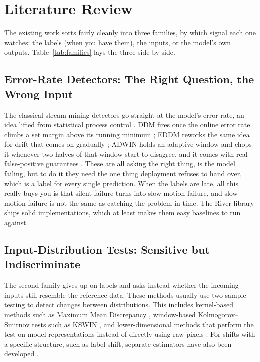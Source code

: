 \documentclass[graybox]{SNmult}
\begin{document}
\section{Literature Review}
\label{sec:survey}

The existing work sorts fairly cleanly into three families, by which
signal each one watches: the labels (when you have them), the inputs, or
the model's own outputs. Table~\ref{tab:families} lays the three side by
side.

\subsection{Error-Rate Detectors: The Right Question, the Wrong Input}

The classical stream-mining detectors go straight at the model's error
rate, an idea lifted from statistical process control
\cite{page1954cusum}. DDM fires once the online error rate climbs a set
margin above its running minimum \cite{gama2004learning}; EDDM reworks
the same idea for drift that comes on gradually \cite{baena2006eddm};
ADWIN holds an adaptive window and chops it whenever two halves of that
window start to disagree, and it comes with real false-positive
guarantees \cite{bifet2007adwin}. These are all asking the right thing,
is the model failing, but to do it they need the one thing deployment
refuses to hand over, which is a label for every single prediction. When
the labels are late, all this really buys you is that silent failure
turns into slow-motion failure, and slow-motion failure is not the same
as catching the problem in time. The River library \cite{montiel2021river}
ships solid implementations, which at least makes them easy baselines to
run against.

\subsection{Input-Distribution Tests: Sensitive but Indiscriminate}

The second family gives up on labels and asks instead whether the
incoming inputs still resemble the reference data. These methods usually use two-sample testing to detect changes between distributions. This includes kernel-based methods such as Maximum Mean Discrepancy
\cite{gretton2012kernel}, window-based Kolmogorov–Smirnov tests such as KSWIN \cite{raab2020kswin}, and lower-dimensional methods that perform the test on model representations instead of directly using raw pixels
\cite{rabanser2019failing}. For shifts with a specific structure, such as label shift, separate estimators have also been developed \cite{lipton2018label}.
\end{document}

